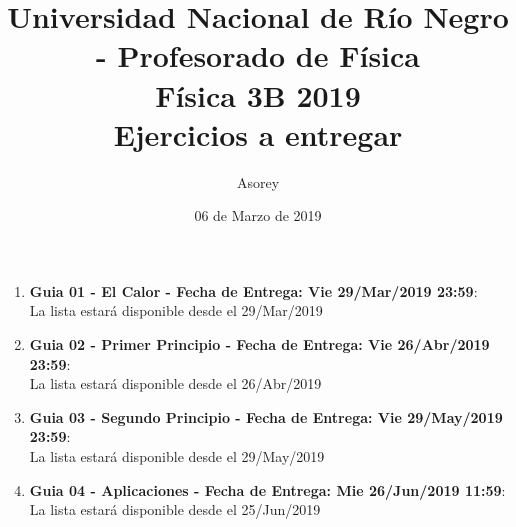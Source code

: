 \documentclass[a4paper,12pt]{article}
\begin{document}
\title{
{\normalsize{Universidad Nacional de Río Negro - Profesorado de Física}}\\
Física 3B 2019\\ Ejercicios a entregar}
\author{Asorey}
\date{06 de Marzo de 2019}
\maketitle

\begin{enumerate}
	\item {\bf{Guia 01 - El Calor - Fecha de Entrega: Vie 29/Mar/2019 23:59}}:\\
		La lista estará disponible desde el 29/Mar/2019
	\item {\bf{Guia 02 - Primer Principio - Fecha de Entrega: Vie 26/Abr/2019 23:59}}:\\		
		La lista estará disponible desde el 26/Abr/2019
	\item {\bf{Guia 03 - Segundo Principio - Fecha de Entrega: Vie 29/May/2019 23:59}}:\\		
		La lista estará disponible desde el 29/May/2019
	\item {\bf{Guia 04 - Aplicaciones - Fecha de Entrega: Mie 26/Jun/2019 11:59}}:\\		
		La lista estará disponible desde el 25/Jun/2019
\end{enumerate}
\end{document}
